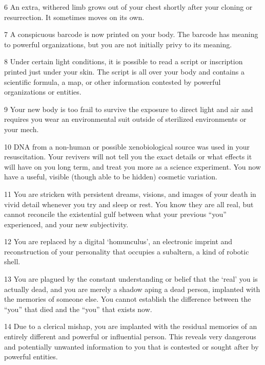 6          An extra, withered limb grows out of your chest shortly after your cloning or resurrection. It  
           sometimes moves on its own. 

7          A conspicuous barcode is now printed on your body. The barcode has meaning to powerful  
           organizations, but you are not initially privy to its meaning. 

8          Under certain light conditions, it is possible to read a script or inscription printed just under  
           your skin. The script is all over your body and contains a scientific formula, a map, or other  
           information contested by powerful organizations or entities. 

9          Your new body is too frail to survive the exposure to direct light and air and requires you wear  
           an environmental suit outside of sterilized environments or your mech. 

10         DNA from a non-human or possible xenobiological source was used in your resuscitation. Your  
           revivers will not tell you the exact details or what effects it will have on you long term, and treat  
           you more as a science experiment. You now have a useful, visible (though able to be hidden)  
           cosmetic variation.  

11         You are stricken with persistent dreams, visions, and images of your death in vivid detail  
           whenever you try and sleep or rest. You know they are all real, but cannot reconcile the  
           existential gulf between what your previous “you” experienced, and your new subjectivity.   

12         You are replaced by a digital ‘homunculus’, an electronic imprint and reconstruction of your  
           personality that occupies a subaltern, a kind of robotic shell.  

13         You are plagued by the constant understanding or belief that the ‘real’ you is actually dead,  
           and you are merely a shadow aping a dead person, implanted with the memories of someone  
           else. You cannot establish the difference between the “you” that died and the “you” that exists  
           now. 

14         Due to a clerical mishap, you are implanted with the residual memories of an entirely different  
           and powerful or influential person. This reveals very dangerous and potentially unwanted  
           information to you that is contested or sought after by powerful entities. 

